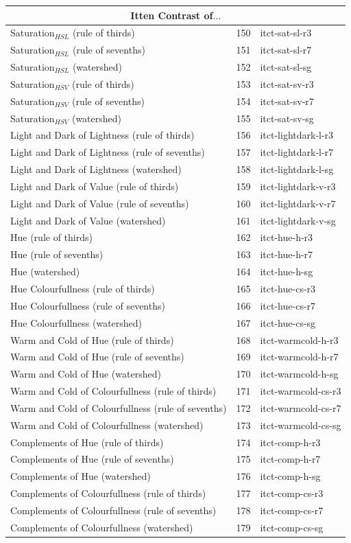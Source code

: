 \documentclass[11pt,a4paper,draft]{report}
\begin{document}
\begin{center}
\begin{longtable}{|l|c|l|}
\midrule
\multicolumn{3}{c}{Itten Contrast of$\ldots$} \\
\midrule
Saturation$_{HSL}$ (rule of thirds) & 150 & itct-sat-sl-r3 \\
Saturation$_{HSL}$ (rule of sevenths) & 151 & itct-sat-sl-r7 \\
Saturation$_{HSL}$ (watershed) & 152 & itct-sat-sl-sg \\
Saturation$_{HSV}$ (rule of thirds) & 153 & itct-sat-sv-r3 \\
Saturation$_{HSV}$ (rule of sevenths) & 154 & itct-sat-sv-r7 \\
Saturation$_{HSV}$ (watershed) & 155 & itct-sat-sv-sg \\
Light and Dark of Lightness (rule of thirds) & 156 & itct-lightdark-l-r3 \\
Light and Dark of Lightness (rule of sevenths) & 157 & itct-lightdark-l-r7 \\
Light and Dark of Lightness (watershed) & 158 & itct-lightdark-l-sg \\
Light and Dark of Value (rule of thirds) & 159 & itct-lightdark-v-r3 \\
Light and Dark of Value (rule of sevenths) & 160 & itct-lightdark-v-r7 \\
Light and Dark of Value (watershed) & 161 & itct-lightdark-v-sg \\
Hue (rule of thirds) & 162 & itct-hue-h-r3 \\
Hue (rule of sevenths) & 163 & itct-hue-h-r7 \\
Hue (watershed) & 164 & itct-hue-h-sg \\
Hue Colourfullness (rule of thirds) & 165 & itct-hue-cs-r3 \\
Hue Colourfullness (rule of sevenths) & 166 & itct-hue-cs-r7 \\
Hue Colourfullness (watershed) & 167 & itct-hue-cs-sg \\
Warm and Cold of Hue (rule of thirds) & 168 & itct-warmcold-h-r3 \\
Warm and Cold of Hue (rule of sevenths) & 169 & itct-warmcold-h-r7 \\
Warm and Cold of Hue (watershed) & 170 & itct-warmcold-h-sg \\
Warm and Cold of Colourfullness (rule of thirds) & 171 & itct-warmcold-cs-r3 \\
Warm and Cold of Colourfullness (rule of sevenths) & 172 & itct-warmcold-cs-r7 \\
Warm and Cold of Colourfullness (watershed) & 173 & itct-warmcold-cs-sg \\
Complements of Hue (rule of thirds) & 174 & itct-comp-h-r3 \\
Complements of Hue (rule of sevenths) & 175 & itct-comp-h-r7 \\
Complements of Hue (watershed) & 176 & itct-comp-h-sg \\
Complements of Colourfullness (rule of thirds) & 177 & itct-comp-cs-r3 \\
Complements of Colourfullness (rule of sevenths) & 178 & itct-comp-cs-r7 \\
Complements of Colourfullness (watershed) & 179 & itct-comp-cs-sg \\


\end{longtable}
\end{center}
\end{document}
